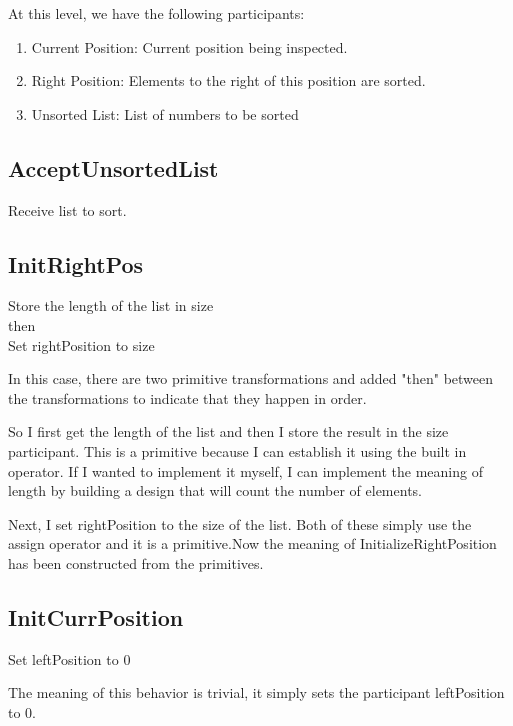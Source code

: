 At this level, we have the following participants:

\begin{enumerate}[noitemsep]
    \item Current Position: Current position being inspected.
    \item Right Position: Elements to the right of this position are sorted.
    \item Unsorted List: List of numbers to be sorted
\end{enumerate}

\subsection{AcceptUnsortedList}
Receive list to sort.

\subsection{InitRightPos}

\begin{greyquote}
    Store the length of the list in size\\
    then \\
    Set rightPosition to size
\end{greyquote}

In this case, there are two primitive transformations and added "then" between the transformations to indicate that they happen in order.

So I first get the length of the list and then I store the result in the size participant. This is a primitive because I can establish it using the built in operator. If I wanted to implement it myself, I can implement the meaning of length by building a design that will count the number of elements.

Next, I set rightPosition to the size of the list. Both of these simply use the assign operator and it is a primitive.Now the meaning of InitializeRightPosition has been constructed from the primitives.

\subsection{InitCurrPosition}
\begin{greyquote}
    Set leftPosition to 0
\end{greyquote}

The meaning of this behavior is trivial, it simply sets the participant leftPosition to 0.

